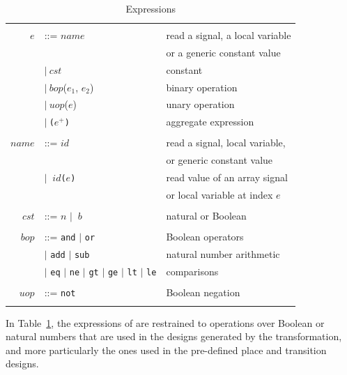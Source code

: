 \documentclass[pdflatex,sn-mathphys]{sn-jnl}%
\theoremstyle{thmstyleone}%
\theoremstyle{thmstyletwo}%
\theoremstyle{thmstylethree}%
\begin{document}
\begin{table}[!t]
  \caption{Expressions}
  \label{tab:expr}
  \begin{tabular}{|rll|}
    \hline
    & & \\
    $e$ & ::= $name$ & read a signal, a local variable \\
    & & or a generic constant value \\
    & \quad $\vert{}~cst$ & constant \\
    & \quad $\vert{}~bop$($e_1$, $e_2$) & binary operation \\
    & \quad $\vert{}~uop$($e$) & unary operation \\
    & \quad $\vert{}~$\texttt{(}$e^{+}$\texttt{)} & aggregate expression \\
    & & \\
    $name$ & ::= $id$ & read a signal, local variable, \\
    & & or generic constant value \\
    & \quad$\vert{}~$ $id$\texttt{(}$e$\texttt{)} & read value of an array signal  \\
    & & or local variable at index $e$ \\
    & & \\
    $cst$ & ::= $n$ $\vert{}~$ $b$ & natural or Boolean \\
    & & \\
    $bop$ & ::= \texttt{and} $\vert{}$ \texttt{or} & Boolean operators \\
    & \quad$\vert{}$ \texttt{add} $\vert{}$ \texttt{sub} & natural number arithmetic \\
    & \quad$\vert{}$ \texttt{eq} $\vert{}$ \texttt{ne} $\vert{}$ \texttt{gt} $\vert{}$ \texttt{ge} $\vert{}$ \texttt{lt} $\vert{}$ \texttt{le} & comparisons \\
    & & \\
    $uop$ & ::= \texttt{not} & Boolean negation \\
    & & \\
    \hline
  \end{tabular}
\end{table}

In Table~\ref{tab:expr}, the expressions of \hvhdl{} are restrained to
operations over Boolean or natural numbers that are used in the
designs generated by the transformation, and more particularly the
ones used in the pre-defined place and transition designs.
\end{document}
